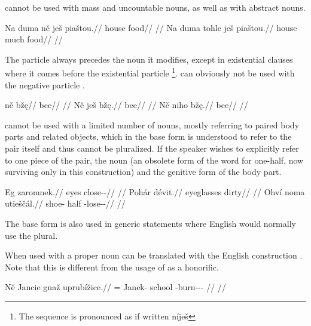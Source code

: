  cannot be used with mass and uncountable nouns, as well as with abstract nouns.

\pex
\a
\begingl
\gla *Na duma n\v{e} ješ piaštou.//
\glb \Loc{} house \Pl{} \Exst{} food//
\glft {}//
\endgl
\a
\begingl
\gla Na duma tohle ješ piaštou.//
\glb \Loc{} house much \Exst{} food//
\glft {}//
\endgl
\xe

The particle  always precedes the noun it modifies, except in existential clauses where it comes before the existential particle \footnote{The sequence is pronounced as if written níješ }.  can obviously not be used with the negative particle .

\pex
\a
\begingl
\gla n\v{e} bž\k{e}//
\glb \Pl{} bee//
\glft {}//
\endgl
\a
\begingl
\gla N\v{e} ješ bž\k{e}.//
\glb \Pl{} \Exst{} bee//
\glft {}//
\endgl
\a
\begingl
\gla *N\v{e} niho bž\k{e}.//
\glb \Pl{}  bee//
\glft {}//
\endgl
\xe

 cannot be used with a limited number of nouns, mostly referring to paired body parts and related objects, which in the base form is understood to refer to the pair itself and thus cannot be pluralized. If the speaker wishes to explicitly refer to one piece of the pair, the noun  (an obsolete form of the word for one-half, now surviving only in this construction) and the genitive form of the body part.

\pex
\begingl
\gla Eg zaromnek.//
\glb eyes close-\Pv{}-\Pf{}//
\glft {}//
\endgl
\xe
\pex
\begingl
\gla Pohár dévit.//
\glb eyeglasses dirty//
\glft {}//
\endgl
\xe
\pex
\begingl
\gla Ohví noma utieščál.//
\glb shoe-\Gen{} half \Refl{}-lose-\Av{}-\Cont{}//
\glft {}//
\endgl
\xe

The base form is also used in generic statements where English would normally use the plural.


When used with a proper noun  can be translated with the English construction . Note that this is different from the usage of  as a honorific.

\pex
\begingl
    \gla N\v{e} Jancie gnaž uprubížice.//
    \glb \Pl{}= Janek-\Gen{} school \Refl{}-burn-\Av{}-\Pf{}-\Quot{} //
    \glft {}//
\endgl
\xe

